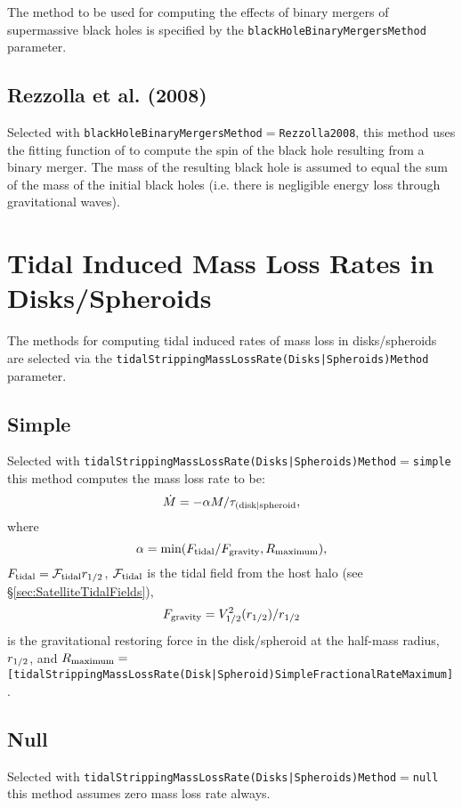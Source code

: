 The method to be used for computing the effects of binary mergers of supermassive black holes is specified by the {\tt blackHoleBinaryMergersMethod} parameter.

\subsection{Rezzolla et al. (2008)}

Selected with {\tt blackHoleBinaryMergersMethod}$=${\tt Rezzolla2008}, this method uses the fitting function of \cite{rezzolla_final_2008} to compute the spin of the black hole resulting from a binary merger. The mass of the resulting black hole is assumed to equal the sum of the mass of the initial black holes (i.e. there is negligible energy loss through gravitational waves).

\section{Tidal Induced Mass Loss Rates in Disks/Spheroids}\label{sec:TidalMassLossRates}

The methods for computing tidal induced rates of mass loss in disks/spheroids are selected via the {\tt tidalStrippingMassLossRate(Disks|Spheroids)Method} parameter.

\subsection{Simple}

Selected with {\tt tidalStrippingMassLossRate(Disks|Spheroids)Method}$=${\tt simple} this method computes the mass loss rate to be:
\begin{equation}
\dot{M} = -\alpha M/\tau_{\rm (disk|spheroid},
\end{equation}
where
\begin{equation}
\alpha = \hbox{min}(F_{\rm tidal}/F_{\rm gravity},R_{\rm maximum}),
\end{equation}
$F_{\rm tidal}=\mathcal{F}_{\rm tidal} r_{1/2}$, $\mathcal{F}_{\rm tidal}$ is the tidal field from the host halo (see \S\ref{sec:SatelliteTidalFields}),
\begin{equation}
F_{\rm gravity} = V_{1/2}^2(r_{1/2})/r_{1/2}
\end{equation}
is the gravitational restoring force in the disk/spheroid at the half-mass radius, $r_{\rm 1/2}$, and $R_{\rm maximum}=${\tt [tidalStrippingMassLossRate(Disk|Spheroid)SimpleFractionalRateMaximum]}.

\subsection{Null}

Selected with {\tt tidalStrippingMassLossRate(Disks|Spheroids)Method}$=${\tt null} this method assumes zero mass loss rate always.

